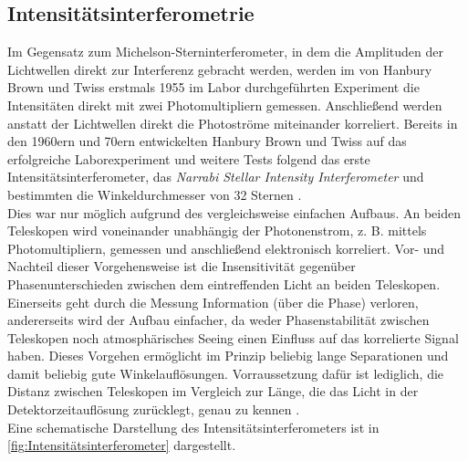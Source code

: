 \subsection{Intensitätsinterferometrie}
\label{ssec:Intensitätsinterferometrie}
Im Gegensatz zum Michelson-Sterninterferometer, in dem die Amplituden der Lichtwellen direkt zur Interferenz gebracht werden, werden im von Hanbury Brown und Twiss erstmals 1955 im Labor durchgeführten Experiment \cite{brownCorrelationPhotonsTwo1956} die Intensitäten direkt mit zwei Photomultipliern gemessen. 
Anschließend werden anstatt der Lichtwellen direkt die Photoströme miteinander korreliert. 
Bereits in den 1960ern und 70ern entwickelten Hanbury Brown und Twiss auf das erfolgreiche Laborexperiment und weitere Tests folgend das erste Intensitätsinterferometer, das \emph{Narrabi Stellar Intensity Interferometer} und bestimmten die Winkeldurchmesser von 32 Sternen \cite[Kap. 1]{brownIntensityInterferometerIts1974}. \\
Dies war nur möglich aufgrund des vergleichsweise einfachen Aufbaus. 
An beiden Teleskopen wird voneinander unabhängig der Photonenstrom, z. B. mittels Photomultipliern, gemessen und anschließend elektronisch korreliert. 
Vor- und Nachteil dieser Vorgehensweise ist die Insensitivität gegenüber Phasenunterschieden zwischen dem eintreffenden Licht an beiden Teleskopen. 
Einerseits geht durch die Messung Information (über die Phase) verloren, andererseits wird der Aufbau einfacher, da weder Phasenstabilität zwischen Teleskopen noch atmosphärisches Seeing einen Einfluss auf das korrelierte Signal haben.
Dieses Vorgehen ermöglicht im Prinzip beliebig lange Separationen und damit beliebig gute Winkelauflösungen. 
Vorraussetzung dafür ist lediglich, die Distanz zwischen Teleskopen im Vergleich zur Länge, die das Licht in der Detektorzeitauflösung zurücklegt, genau zu kennen \cite{DemonstrationStellarIntensity}. 
\\
Eine schematische Darstellung des Intensitätsinterferometers ist in \autoref{fig:Intensitätsinterferometer} dargestellt. 
